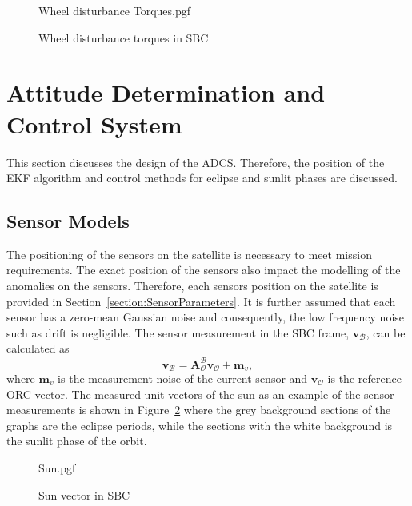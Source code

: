 \begin{figure}[!htb]
	\centering
	\def\pgfwidth{10cm}
	{Wheel disturbance Torques.pgf}
	
	\caption{Wheel disturbance torques in SBC}
	\label{fig:Wheel disturbance Torques}
\end{figure}

\section{Attitude Determination and Control System}
\label{section:ADCS}
This section discusses the design of the ADCS. Therefore, the position of the EKF algorithm and control methods for eclipse and sunlit phases are discussed. 

\subsection{Sensor Models}
\label{section:SensorModel}
The positioning of the sensors on the satellite is necessary to meet mission requirements. The exact position of the sensors also impact the modelling of the anomalies on the sensors. Therefore, each sensors position on the satellite is provided in Section~\ref{section:SensorParameters}. It is further assumed that each sensor has a zero-mean Gaussian noise and consequently, the low frequency noise such as drift is negligible. The sensor measurement in the SBC frame, $\mathbf{v}_{\mathcal{B}}$,  can be calculated as
\begin{equation}
	\mathbf{v}_{\mathcal{B}} = \boldsymbol{A}^{\mathcal{B}}_{\mathcal{O}} \mathbf{v}_\mathcal{O} + \mathbf{m}_v,
\end{equation}
where $\mathbf{m}_v$ is the measurement noise of the current sensor and $\mathbf{v}_{\mathcal{O}}$ is the reference ORC vector. The measured unit vectors of the sun as an example of the sensor measurements is shown in Figure~\ref{fig:SunSensorPlot} where the grey background sections of the graphs are the eclipse periods, while the sections with the white background is the sunlit phase of the orbit.

\begin{figure}[!htb]
	\centering
	\def\pgfwidth{7cm}
	{Sun.pgf}
	
	\caption{Sun vector in SBC}
	\label{fig:SunSensorPlot}
\end{figure}

